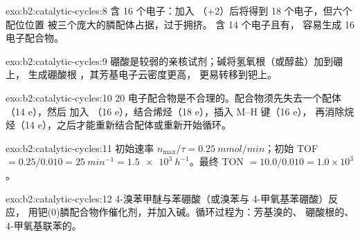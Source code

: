\begin{solution}{exo:b2:catalytic-cycles:8}
 含 16 个电子：加入 （+2）后将得到 18 个电子，但六个配位位置
被三个庞大的膦配体占据，过于拥挤。 含 14 个电子且有，
容易生成 16 电子配合物。
\end{solution}

\begin{solution}{exo:b2:catalytic-cycles:9}
硼酸是较弱的亲核试剂；碱将氢氧根（或醇盐）加到硼上，
生成硼酸根 ，其芳基电子云密度更高，
更易转移到钯上。
\end{solution}

\begin{solution}{exo:b2:catalytic-cycles:10}
20 电子配合物是不合理的。配合物须先失去一个配体（14 e），然后
加入 （16 e），结合烯烃（18 e），插入 M--H 键（16 e），
再消除烷烃（14 e），之后才能重新结合配体或重新开始循环。
\end{solution}

\begin{solution}{exo:b2:catalytic-cycles:11}
初始速率 $n_{\max}/\tau = \qty{0.25}{mmol/min}$；初始 TOF $= 0.25/0.010 =
\qty{25}{min^{-1}} = \qty{1.5e3}{h^{-1}}$。最终 TON $= 10.0/0.010 = 1.0 \times 10^3$。
\end{solution}

\begin{solution}{exo:b2:catalytic-cycles:12}
4-溴苯甲醚与苯硼酸（或溴苯与 4-甲氧基苯硼酸）反应，
用钯(0)膦配合物作催化剂，并加入碱。循环过程为：芳基溴的、
硼酸根的、
4-甲氧基联苯的。
\end{solution}

